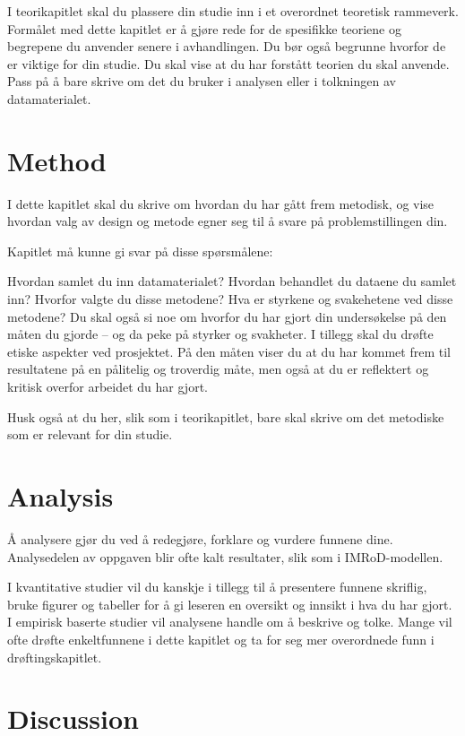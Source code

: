 \documentclass{article}
\begin{document}
I teorikapitlet skal du plassere din studie inn i et overordnet teoretisk rammeverk. Formålet med dette kapitlet er å gjøre rede for de spesifikke teoriene og begrepene du anvender senere i avhandlingen. Du bør også begrunne hvorfor de er viktige for din studie. Du skal vise at du har forstått teorien du skal anvende. Pass på å bare skrive om det du bruker i analysen eller i tolkningen av datamaterialet.

\section{Method}

I dette kapitlet skal du skrive om hvordan du har gått frem metodisk, og vise hvordan valg av design og metode egner seg til å svare på problemstillingen din.

Kapitlet må kunne gi svar på disse spørsmålene:

Hvordan samlet du inn datamaterialet?
Hvordan behandlet du dataene du samlet inn?
Hvorfor valgte du disse metodene?
Hva er styrkene og svakehetene ved disse metodene?
Du skal også si noe om hvorfor du har gjort din undersøkelse på den måten du gjorde – og da peke på styrker og svakheter. I tillegg skal du drøfte etiske aspekter ved prosjektet. På den måten viser du at du har kommet frem til resultatene på en pålitelig og troverdig måte, men også at du er reflektert og kritisk overfor arbeidet du har gjort.

Husk også at du her, slik som i teorikapitlet, bare skal skrive om det metodiske som er relevant for din studie.

\section{Analysis}

Å analysere gjør du ved å redegjøre, forklare og vurdere funnene dine. Analysedelen av oppgaven blir ofte kalt resultater, slik som i IMRoD-modellen.

I kvantitative studier vil du kanskje i tillegg til å presentere funnene skriflig, bruke figurer og tabeller for å gi leseren en oversikt og innsikt i hva du har gjort.
I empirisk baserte studier vil analysene handle om å beskrive og tolke. Mange vil ofte drøfte enkeltfunnene i dette kapitlet og ta for seg mer overordnede funn i drøftingskapitlet.


\section{Discussion}
\end{document}

